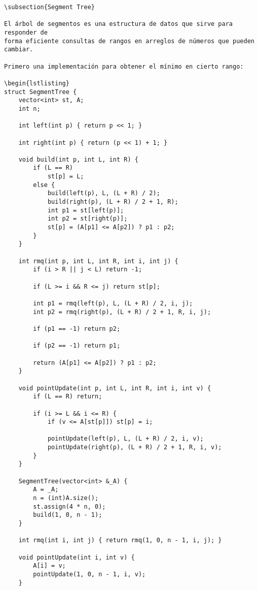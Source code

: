\documentclass[11pt]{article}
\begin{document}
\begin{verbatim}
\subsection{Segment Tree}

El árbol de segmentos es una estructura de datos que sirve para responder de
forma eficiente consultas de rangos en arreglos de números que pueden cambiar.

Primero una implementación para obtener el mínimo en cierto rango:

\begin{lstlisting}
struct SegmentTree {
    vector<int> st, A;
    int n;

    int left(int p) { return p << 1; }

    int right(int p) { return (p << 1) + 1; }

    void build(int p, int L, int R) {
        if (L == R)
            st[p] = L;
        else {
            build(left(p), L, (L + R) / 2);
            build(right(p), (L + R) / 2 + 1, R);
            int p1 = st[left(p)];
            int p2 = st[right(p)];
            st[p] = (A[p1] <= A[p2]) ? p1 : p2;
        }
    }

    int rmq(int p, int L, int R, int i, int j) {
        if (i > R || j < L) return -1;

        if (L >= i && R <= j) return st[p];

        int p1 = rmq(left(p), L, (L + R) / 2, i, j);
        int p2 = rmq(right(p), (L + R) / 2 + 1, R, i, j);

        if (p1 == -1) return p2;

        if (p2 == -1) return p1;

        return (A[p1] <= A[p2]) ? p1 : p2;
    }

    void pointUpdate(int p, int L, int R, int i, int v) {
        if (L == R) return;

        if (i >= L && i <= R) {
            if (v <= A[st[p]]) st[p] = i;
            
            pointUpdate(left(p), L, (L + R) / 2, i, v);
            pointUpdate(right(p), (L + R) / 2 + 1, R, i, v);
        }
    }

    SegmentTree(vector<int> &_A) {
        A = _A;
        n = (int)A.size();
        st.assign(4 * n, 0);
        build(1, 0, n - 1);
    }

    int rmq(int i, int j) { return rmq(1, 0, n - 1, i, j); }

    void pointUpdate(int i, int v) {
        A[i] = v;
        pointUpdate(1, 0, n - 1, i, v);
    }


\end{verbatim}
\end{document}
